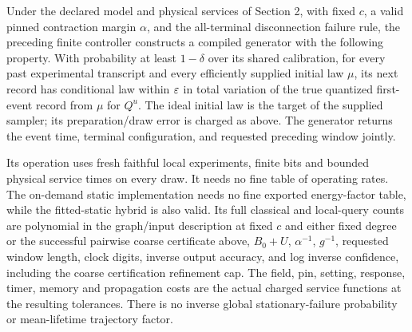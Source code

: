 \begin{theorem}\label{thm:full}
Under the declared model and physical services of Section 2, with fixed
$c$, a valid pinned contraction margin $\alpha$, and the all-terminal
disconnection failure rule, the preceding finite controller constructs a
compiled generator with the following property. With probability at least
$1-\delta$ over its shared calibration, for every past experimental
transcript and every efficiently supplied initial law $\mu$, its next
record has conditional law within $\varepsilon$ in total variation of the true
quantized first-event record from $\mu$ for $Q^u$. The ideal initial law is
the target of the supplied sampler; its preparation/draw error is charged
as above. The generator returns the event time, terminal configuration,
and requested preceding window jointly.

Its operation uses fresh faithful local experiments, finite bits and
bounded physical service times on every draw. It needs no fine table of
operating rates. The on-demand static implementation needs no fine
exported energy-factor table, while the fitted-static hybrid is also
valid. Its full classical and local-query counts are polynomial in
the graph/input description at fixed $c$ and either fixed degree or
the successful pairwise coarse certificate above,
$B_0+U$, $\alpha^{-1}$, $g^{-1}$, requested window length,
clock digits, inverse output accuracy, and log inverse confidence,
including the coarse certification refinement cap.
The field, pin, setting, response, timer, memory and propagation costs
are the actual charged service functions at the resulting tolerances.
There is no inverse global stationary-failure probability or mean-lifetime
trajectory factor.
\end{theorem}
